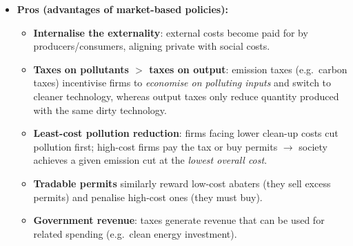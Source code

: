 \documentclass[a4paper,12pt]{article}
\begin{document}
\begin{itemize}
\begin{itemize}
\begin{center}
\end{center}
  \end{itemize}
  \begin{itemize}
    \item \textbf{Pros (advantages of market-based policies):}
    \begin{itemize}
      \item \textbf{Internalise the externality}: external costs become paid for by producers/consumers, aligning private with social costs.
      \item \textbf{Taxes on pollutants $>$ taxes on output}: emission taxes (e.g.\ carbon taxes) incentivise firms to \textit{economise on polluting inputs} and switch to cleaner technology, whereas output taxes only reduce quantity produced with the same dirty technology.
      \item \textbf{Least-cost pollution reduction}: firms facing lower clean-up costs cut pollution first; high-cost firms pay the tax or buy permits $\to$ society achieves a given emission cut at the \textit{lowest overall cost}.
      \item \textbf{Tradable permits} similarly reward low-cost abaters (they sell excess permits) and penalise high-cost ones (they must buy).
      \item \textbf{Government revenue}: taxes generate revenue that can be used for related spending (e.g.\ clean energy investment).
    \end{itemize}

\end{itemize}
\end{itemize}
\end{document}
